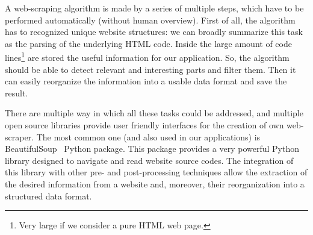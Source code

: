\documentclass{standalone}
\begin{document}
A \textsf{web-scraping} algorithm is made by a series of multiple steps, which have to be performed automatically (without human overview).
First of all, the algorithm has to recognized unique website structures: we can broadly summarize this task as the parsing of the underlying \textsf{HTML} code.
Inside the large amount of code lines\footnote{
  Very large if we consider a pure \textsf{HTML} web page.
} are stored the useful information for our application.
So, the algorithm should be able to detect relevant and interesting parts and filter them.
Then it can easily reorganize the information into a usable data format and save the result.

There are multiple way in which all these tasks could be addressed, and multiple open source libraries provide user friendly interfaces for the creation of own web-scraper.
The most common one (and also used in our applications) is \textsf{BeautifulSoup}~\cite{richardson2007beautiful} \textsf{Python} package.
This package provides a very powerful \textsf{Python} library designed to navigate and read website source codes.
The integration of this library with other pre- and post-processing techniques allow the extraction of the desired information from a website and, moreover, their reorganization into a structured data format.
\end{document}
